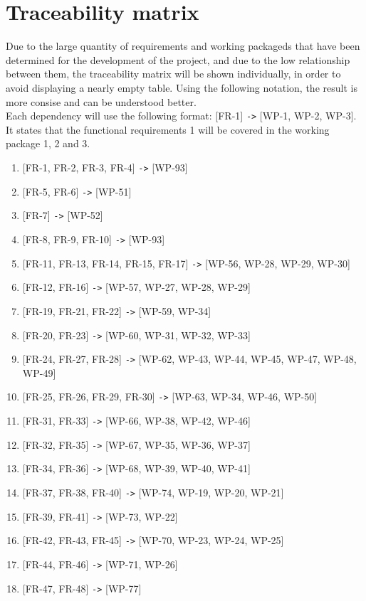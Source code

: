 \documentclass[a4paper, 12pt, oneside]{book}
\begin{document}
\section{Traceability matrix}
Due to the large quantity of requirements and working packageds that have been determined for the development of the project, and due to the low relationship between them, the traceability matrix will be shown individually, in order to avoid displaying a nearly empty table. Using the following notation, the result is more consise and can be understood better.
\\[8pt]
Each dependency will use the following format: [FR-1] \texttt{->} [WP-1, WP-2, WP-3]. It states that the functional requirements 1 will be covered in the working package 1, 2 and 3.
\begin{enumerate}[label = -]
	\item {[FR-1, FR-2, FR-3, FR-4] \texttt{->} [WP-93]}
	\item {[FR-5, FR-6] \texttt{->} [WP-51]}
	\item {[FR-7] \texttt{->} [WP-52]}
	\item {[FR-8, FR-9, FR-10] \texttt{->} [WP-93]}
	\item {[FR-11, FR-13, FR-14, FR-15, FR-17] \texttt{->} [WP-56, WP-28, WP-29, WP-30]}
	\item {[FR-12, FR-16] \texttt{->} [WP-57, WP-27, WP-28, WP-29]}
	\item {[FR-19, FR-21, FR-22] \texttt{->} [WP-59, WP-34]}
	\item {[FR-20, FR-23] \texttt{->} [WP-60, WP-31, WP-32, WP-33]}
	\item {[FR-24, FR-27, FR-28] \texttt{->} [WP-62, WP-43, WP-44, WP-45, WP-47, WP-48, WP-49]}
	\item {[FR-25, FR-26, FR-29, FR-30] \texttt{->} [WP-63, WP-34, WP-46, WP-50]}
	\item {[FR-31, FR-33] \texttt{->} [WP-66, WP-38, WP-42, WP-46]}
	\item {[FR-32, FR-35] \texttt{->} [WP-67, WP-35, WP-36, WP-37]}
	\item {[FR-34, FR-36] \texttt{->} [WP-68, WP-39, WP-40, WP-41]}
	\item {[FR-37, FR-38, FR-40] \texttt{->} [WP-74, WP-19, WP-20, WP-21]}
	\item {[FR-39, FR-41] \texttt{->} [WP-73, WP-22]}
	\item {[FR-42, FR-43, FR-45] \texttt{->} [WP-70, WP-23, WP-24, WP-25]}
	\item {[FR-44, FR-46] \texttt{->} [WP-71, WP-26]}
	\item {[FR-47, FR-48] \texttt{->} [WP-77]}

\end{enumerate}
\end{document}
